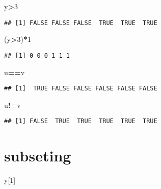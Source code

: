 \documentclass[]{article}
\newenvironment{Shaded}{\begin{snugshade}}{\end{snugshade}}
\newcommand{\DecValTok}[1]{\textcolor[rgb]{0.00,0.00,0.81}{#1}}
\newcommand{\OperatorTok}[1]{\textcolor[rgb]{0.81,0.36,0.00}{\textbf{#1}}}
\newcommand{\NormalTok}[1]{#1}
\begin{document}
\begin{Shaded}
\begin{Highlighting}[]
\NormalTok{y}\OperatorTok{>}\DecValTok{3}
\end{Highlighting}
\end{Shaded}

\begin{verbatim}
## [1] FALSE FALSE FALSE  TRUE  TRUE  TRUE
\end{verbatim}

\begin{Shaded}
\begin{Highlighting}[]
\NormalTok{(y}\OperatorTok{>}\DecValTok{3}\NormalTok{)}\OperatorTok{*}\DecValTok{1}
\end{Highlighting}
\end{Shaded}

\begin{verbatim}
## [1] 0 0 0 1 1 1
\end{verbatim}

\begin{Shaded}
\begin{Highlighting}[]
\NormalTok{u}\OperatorTok{==}\NormalTok{v}
\end{Highlighting}
\end{Shaded}

\begin{verbatim}
## [1]  TRUE FALSE FALSE FALSE FALSE FALSE
\end{verbatim}

\begin{Shaded}
\begin{Highlighting}[]
\NormalTok{u}\OperatorTok{!=}\NormalTok{v}
\end{Highlighting}
\end{Shaded}

\begin{verbatim}
## [1] FALSE  TRUE  TRUE  TRUE  TRUE  TRUE
\end{verbatim}

\section{subseting}\label{subseting}

\begin{Shaded}
\begin{Highlighting}[]
\NormalTok{y[}\DecValTok{1}\NormalTok{]}
\end{Highlighting}
\end{Shaded}
\end{document}
